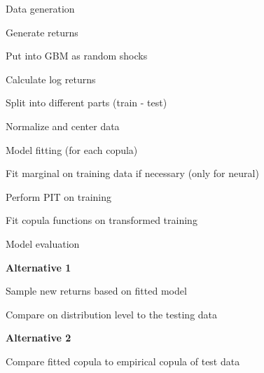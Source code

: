 \begin{generalinstructions}
    \begin{compactenum}
        \item Data generation
        \begin{compactenum}
            \item Generate returns
            \item Put into GBM as random shocks 
            \item Calculate log returns 
            \item Split into different parts (train - test)
            \item Normalize and center data
        \end{compactenum}
        \item Model fitting (for each copula)
        \begin{compactenum}
            \item Fit marginal on training data if necessary (only for neural) 
            \item Perform PIT on training
            \item Fit copula functions on transformed training
        \end{compactenum}
        \item Model evaluation
        
        \textbf{Alternative 1}
        \begin{compactenum}
            \item Sample new returns based on fitted model
            \item Compare on distribution level to the testing data
        \end{compactenum}
        \textbf{Alternative 2}
        \begin{compactenum}
            \item Compare fitted copula to empirical copula of test data
        \end{compactenum}
    \end{compactenum}
\end{generalinstructions}

